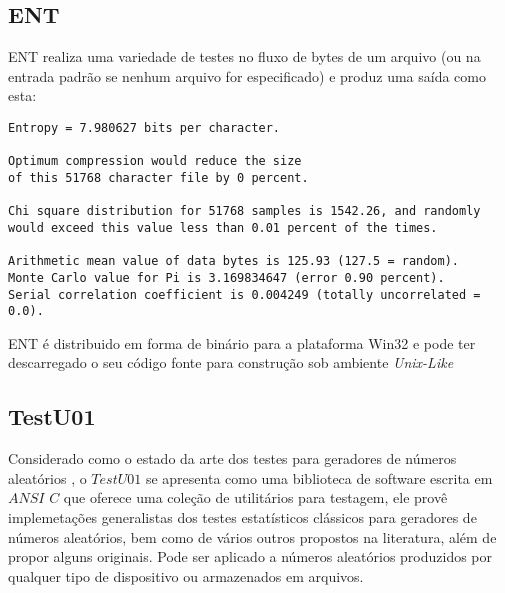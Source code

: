 %   

\subsection{ENT}

ENT \citet{ENTTestSuite} realiza uma variedade de testes no fluxo de bytes de um arquivo (ou na entrada padrão se nenhum arquivo for especificado) e produz uma saída como esta:

\begin{verbatim}
Entropy = 7.980627 bits per character.

Optimum compression would reduce the size
of this 51768 character file by 0 percent.

Chi square distribution for 51768 samples is 1542.26, and randomly
would exceed this value less than 0.01 percent of the times.

Arithmetic mean value of data bytes is 125.93 (127.5 = random).
Monte Carlo value for Pi is 3.169834647 (error 0.90 percent).
Serial correlation coefficient is 0.004249 (totally uncorrelated = 0.0).
\end{verbatim}

ENT é distribuido em forma de binário para a plataforma Win32 e pode ter descarregado o seu código fonte para construção sob ambiente \textit{Unix-Like}
  
\subsection{TestU01}	

Considerado como o estado da arte dos testes para geradores de números aleatórios \citet{LEcuyer:07}, o $TestU01$ se apresenta como uma biblioteca de software escrita em $ANSI$ $C$ que oferece uma coleção de utilitários para testagem, ele provê implemetações generalistas dos testes estatísticos clássicos para geradores de números aleatórios, bem como de vários outros propostos na literatura, além de propor alguns originais. Pode ser aplicado a números aleatórios produzidos por qualquer tipo de dispositivo ou armazenados em arquivos.

